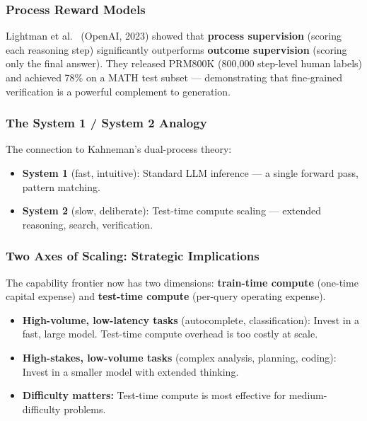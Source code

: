\documentclass[11pt, a4paper]{article}
\theoremstyle{definition}
\theoremstyle{plain}
\begin{document}
\subsubsection{Process Reward Models}

Lightman et al.~\cite{lightman2023lets} (OpenAI, 2023) showed that \textbf{process supervision} (scoring each reasoning step) significantly outperforms \textbf{outcome supervision} (scoring only the final answer). They released PRM800K (800,000 step-level human labels) and achieved 78\% on a MATH test subset --- demonstrating that fine-grained verification is a powerful complement to generation.

\subsubsection{The System 1 / System 2 Analogy}

The connection to Kahneman's dual-process theory:
\begin{itemize}
  \item \textbf{System 1} (fast, intuitive): Standard LLM inference --- a single forward pass, pattern matching.
  \item \textbf{System 2} (slow, deliberate): Test-time compute scaling --- extended reasoning, search, verification.
\end{itemize}

\subsubsection{Two Axes of Scaling: Strategic Implications}

The capability frontier now has two dimensions: \textbf{train-time compute} (one-time capital expense) and \textbf{test-time compute} (per-query operating expense).

\begin{itemize}
  \item \textbf{High-volume, low-latency tasks} (autocomplete, classification): Invest in a fast, large model. Test-time compute overhead is too costly at scale.
  \item \textbf{High-stakes, low-volume tasks} (complex analysis, planning, coding): Invest in a smaller model with extended thinking.
  \item \textbf{Difficulty matters:} Test-time compute is most effective for medium-difficulty problems.
\end{itemize}


\end{document}
